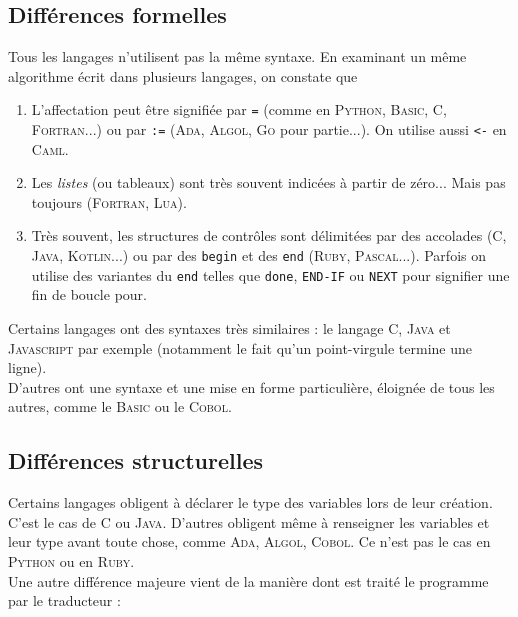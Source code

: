 \subsection{Différences formelles}

Tous les langages n'utilisent pas la même syntaxe. En examinant un même algorithme écrit dans plusieurs langages, on constate que 

\begin{enumerate}[--]
    \item   L'affectation peut être signifiée par \texttt{=} (comme en \textsc{Python}, \textsc{Basic}, \textsc{C}, \textsc{Fortran}...) ou par \texttt{:=} (\textsc{Ada}, \textsc{Algol}, \textsc{Go} pour partie...). On utilise aussi \texttt{<-} en \textsc{Caml}.
    \item   Les \textit{listes} (ou tableaux) sont très souvent indicées à partir de zéro... Mais pas toujours (\textsc{Fortran}, \textsc{Lua}).
    \item   Très souvent, les structures de contrôles sont délimitées par des accolades (\textsc{C}, \textsc{Java},  \textsc{Kotlin}...) ou par des \texttt{begin} et des \texttt{end} (\textsc{Ruby}, \textsc{Pascal}...). Parfois on utilise des variantes du \texttt{end} telles que \texttt{done}, \texttt{END-IF} ou \texttt{NEXT} pour signifier une fin de boucle \og pour\fg{}.
\end{enumerate}

Certains langages ont des syntaxes très similaires : le langage \textsc{C}, \textsc{Java} et \textsc{Javascript} par exemple (notamment le fait qu'un point-virgule termine une ligne).\\
D'autres ont une syntaxe et une mise en forme particulière, éloignée de tous les autres, comme le \textsc{Basic} ou le \textsc{Cobol}.

\subsection{Différences structurelles}

Certains langages obligent à déclarer le type des variables lors de leur création. C'est le cas de \textsc{C} ou \textsc{Java}. D'autres obligent même à renseigner les variables et leur type avant toute chose, comme \textsc{Ada}, \textsc{Algol}, \textsc{Cobol}. Ce n'est pas le cas en \textsc{Python} ou en \textsc{Ruby}.\\

Une autre différence majeure vient de la manière dont est traité le programme par le traducteur :

